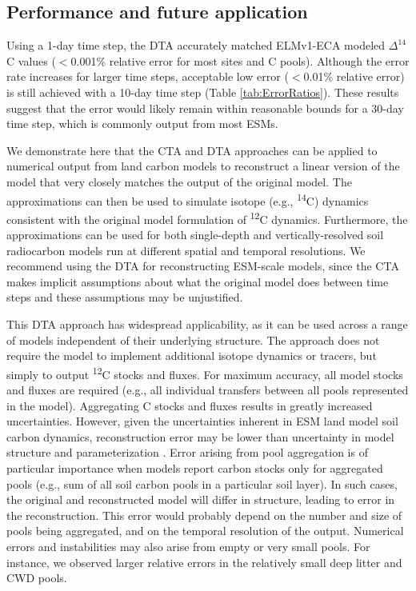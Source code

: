 \documentclass[11pt,a4paper]{article}
\begin{document}
\subsection{Performance and future application}
Using a 1-day time step, the DTA accurately matched ELMv1-ECA modeled $\Delta^{14}$C values ($<$0.001\% relative error for most sites and C pools). Although the error rate increases for larger time steps, acceptable low error ($<$0.01\% relative error) is still achieved with a 10-day time step (Table \ref{tab:ErrorRatios}). These results suggest that the error would likely remain within reasonable bounds for a 30-day time step, which is commonly output from most ESMs.

We demonstrate here that the CTA and DTA  approaches can be applied to numerical output from land carbon models to reconstruct a linear version of the model that very closely matches the output of the original model. The approximations can then be used to simulate isotope (e.g., \textsuperscript{14}C) dynamics consistent with the original model formulation of \textsuperscript{12}C dynamics. Furthermore, the approximations can be used for both single-depth and vertically-resolved soil radiocarbon models run at different spatial and temporal resolutions. We recommend using the DTA for reconstructing ESM-scale models, since the CTA makes implicit assumptions about what the original model does between time steps and these assumptions may  be unjustified.

This DTA approach has widespread applicability, as it can be used across a range of models independent of their underlying structure. The approach does not require the model to implement additional isotope dynamics or tracers, but simply to output \textsuperscript{12}C stocks and fluxes. For maximum accuracy, all model stocks and fluxes are required (e.g., all individual transfers between all pools represented in the model). Aggregating C stocks and fluxes results in greatly increased uncertainties. However, given the uncertainties inherent in ESM land model soil carbon dynamics, reconstruction error may be lower than uncertainty in model structure and parameterization \citep{Chen2009JGR}. Error arising from pool aggregation is of particular importance when models report carbon stocks only for aggregated pools (e.g., sum of all soil carbon pools in a particular soil layer). In such cases, the original and reconstructed model will differ in structure, leading to error in the reconstruction. This error would probably depend on the number and size of pools being aggregated, and on the temporal resolution of the output. Numerical errors and instabilities may also arise from empty or very small pools. For instance, we observed larger relative errors in the relatively small deep litter and CWD pools.
\end{document}
